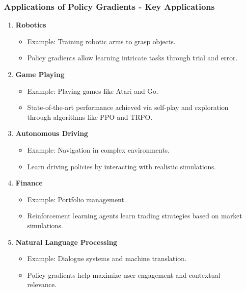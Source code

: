 \documentclass[aspectratio=169]{beamer}
\begin{document}
\begin{frame}[fragile]
    \frametitle{Applications of Policy Gradients - Key Applications}
    \begin{enumerate}
        \item \textbf{Robotics}
        \begin{itemize}
            \item Example: Training robotic arms to grasp objects.
            \item Policy gradients allow learning intricate tasks through trial and error.
        \end{itemize}
        
        \item \textbf{Game Playing}
        \begin{itemize}
            \item Example: Playing games like Atari and Go.
            \item State-of-the-art performance achieved via self-play and exploration through algorithms like PPO and TRPO.
        \end{itemize}
        
        \item \textbf{Autonomous Driving}
        \begin{itemize}
            \item Example: Navigation in complex environments.
            \item Learn driving policies by interacting with realistic simulations.
        \end{itemize}
        
        \item \textbf{Finance}
        \begin{itemize}
            \item Example: Portfolio management.
            \item Reinforcement learning agents learn trading strategies based on market simulations.
        \end{itemize}
        
        \item \textbf{Natural Language Processing}
        \begin{itemize}
            \item Example: Dialogue systems and machine translation.
            \item Policy gradients help maximize user engagement and contextual relevance.
        \end{itemize}
    \end{enumerate}
\end{frame}
\end{document}
